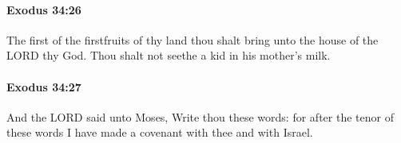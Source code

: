 		\paragraph{Exodus 34:26} %
			\label{EXODUS-34-26}

			The first of the firstfruits of thy land thou shalt bring unto the house of the LORD thy God. Thou shalt not seethe a kid in his mother's milk.


		\paragraph{Exodus 34:27} %
			\label{EXODUS-34-27}

			And the LORD said unto Moses, Write thou these words: for after the tenor of these words I have made a covenant with thee and with Israel.


